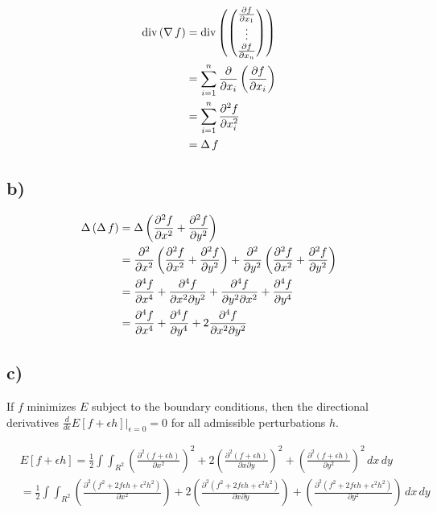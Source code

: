\documentclass{article}
\begin{document}
\begin{align*}
	\operatorname{div}\left(\operatorname{\nabla}{f}\right) &= \operatorname{div}\left(\begin{pmatrix} \frac{\partial f}{\partial x_1}\\ \vdots \\ \frac{\partial f}{\partial x_n} \end{pmatrix}\right)\\
	&= \sum_{i=1}^{n} \frac{\partial}{\partial x_i} \left(\frac{\partial f}{\partial x_i}\right)\\
	&= \sum_{i=1}^{n} \frac{\partial^2 f}{\partial x_i^2}\\
	&= \operatorname{\Delta} f
\end{align*}

\subsection*{b)}

\begin{align*}
	\operatorname{\Delta} \left(\operatorname{\Delta} f\right) &= \operatorname{\Delta} \left( \frac{\partial^2 f}{\partial x^2} + \frac{\partial^2 f}{\partial y^2}\right)\\
	&= \frac{\partial^2}{\partial x^2} \left( \frac{\partial^2 f}{\partial x^2} + \frac{\partial^2 f}{\partial y^2}\right) + \frac{\partial^2}{\partial y^2} \left( \frac{\partial^2 f}{\partial x^2} + \frac{\partial^2 f}{\partial y^2}\right)\\
	&= \frac{\partial^4 f}{\partial x^4} + \frac{\partial^4 f}{\partial x^2 \partial y^2} + \frac{\partial^4 f}{\partial y^2 \partial x^2} + \frac{\partial^4 f}{\partial y^4}\\
	&= \frac{\partial^4 f}{\partial x^4} + \frac{\partial^4 f}{\partial y^4} + 2 \frac{\partial^4 f}{\partial x^2 \partial y^2}
\end{align*}

\subsection*{c)}
If $f$ minimizes $E$ subject to the boundary conditions, then the directional derivatives $\frac{d}{d\epsilon}E\left[f+\epsilon h\right]\Bigg|_{\epsilon=0} = 0$ for all admissible perturbations $h$.

\begin{align*}
	&E\left[f+\epsilon h\right] = \frac{1}{2} \int \int_{R^2} \left(\frac{\partial^2(f+\epsilon h)}{\partial x^2}\right)^2 + 2\left(\frac{\partial^2(f+\epsilon h)}{\partial x \partial y}\right)^2 + \left(\frac{\partial^2(f+\epsilon h)}{\partial y^2}\right)^2 \, dx\, dy\\
	&= \frac{1}{2} \int \int_{R^2} \left(\frac{\partial^2(f^2 + 2f\epsilon h + \epsilon^2 h^2)}{\partial x^2}\right) + 2\left(\frac{\partial^2(f^2 + 2f\epsilon h + \epsilon^2 h^2)}{\partial x \partial y}\right) + \left(\frac{\partial^2(f^2 + 2f\epsilon h + \epsilon^2 h^2)}{\partial y^2}\right) \, dx\, dy\\
\end{align*}
\end{document}

